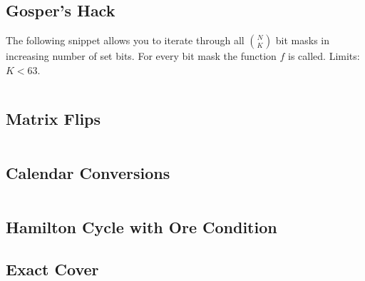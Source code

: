 \subsection{Gosper's Hack}

The following snippet allows you to iterate through all
$N\choose K$ bit masks in increasing number of set bits.
For every bit mask the function $f$ is called. Limits: $K < 63$.

\hrulefill \vspace{-\baselineskip}
\begin{multicols}{2}
\inputminted[autogobble,fontsize=\tiny]{C++}{Misc/gospers_hack.cpp}
\end{multicols}
\vspace{-\baselineskip}
\noindent \hrulefill

\subsection{Matrix Flips}

\hrulefill \vspace{-\baselineskip}
\begin{multicols}{2}
\inputminted[autogobble,fontsize=\tiny]{C++}{Misc/rotate.cpp}
\end{multicols}
\vspace{-\baselineskip}
\noindent \hrulefill

\subsection{Calendar Conversions}

\hrulefill \vspace{-\baselineskip}
\begin{multicols}{2}
\inputminted[autogobble,fontsize=\tiny]{C++}{Misc/dates.cpp}
\end{multicols}
\vspace{-\baselineskip}
\noindent \hrulefill

\subsection{Hamilton Cycle with Ore Condition}

\newpage

\subsection{Exact Cover}

\hrulefill \vspace{-\baselineskip}
\begin{multicols}{2}
\inputminted[autogobble,fontsize=\tiny]{C++}{Misc/exact_cover.cpp}
\end{multicols}
\vspace{-\baselineskip}
\noindent \hrulefill

